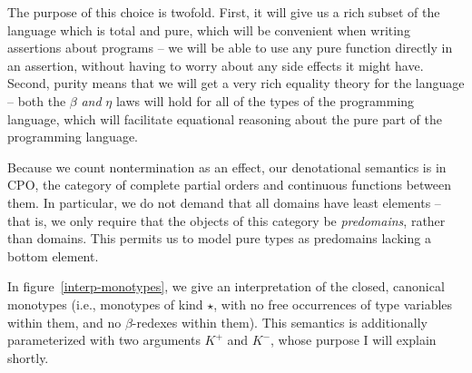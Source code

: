 The purpose of this choice is twofold. First, it will give us a rich
subset of the language which is total and pure, which will be convenient
when writing assertions about programs -- we will be able to use any pure 
function directly in an assertion, without having to worry about any 
side effects it might have. Second, purity means that we will get a 
very rich equality theory for the language -- both the $\beta$ \emph{and}
$\eta$ laws will hold for all of the types of the programming language,
which will facilitate equational reasoning about the pure part of the 
programming language. 

Because we count nontermination as an effect, our denotational
semantics is in CPO, the category of complete partial orders and
continuous functions between them. In particular, we do not demand
that all domains have least elements -- that is, we only require that
the objects of this category be \emph{predomains}, rather than
domains. This permits us to model pure types as predomains lacking a
bottom element.

In figure~\ref{interp-monotypes}, we give an interpretation of the
closed, canonical monotypes (i.e., monotypes of kind $\star$, with no
free occurrences of type variables within them, and no $\beta$-redexes
within them).  This semantics is additionally parameterized with two
arguments $K^+$ and $K^-$, whose purpose I will explain shortly.

